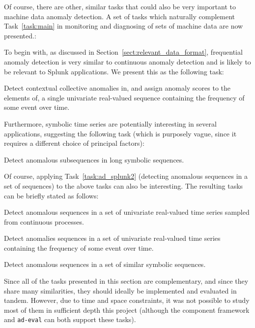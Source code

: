 Of course, there are other, similar tasks that could also be very important to machine data anomaly detection. A set of tasks which naturally complement Task~\ref{task:main} in monitoring and diagnosing of sets of machine data are now presented.:

To begin with, as discussed in Section~\ref{sect:relevant_data_format}, frequential anomaly detection is very similar to continuous anomaly detection and is likely to be relevant to Splunk applications. We present this as the following task:

\begin{task}
  Detect contextual collective anomalies in, and assign anomaly scores to the elements of, a single univariate real-valued sequence containing the frequency of some event over time.
\end{task}

Furthermore, symbolic time series are potentially interesting in several applications, suggesting the following task (which is purposely vague, since it requires a different choice of principal factors):

\begin{task}
  Detect anomalous subsequences in long symbolic sequences.
\end{task}

Of course, applying Task~\ref{task:ad_splunk2} (detecting anomalous sequences in a set of sequences) to the above tasks can also be interesting. The resulting tasks can be briefly stated as follows:

\begin{task}
  Detect anomalous sequences in a set of univariate real-valued time series sampled from continuous processes.
\end{task}

\begin{task}
  Detect anomalies sequences in a set of univariate real-valued time series containing the frequency of some event over time.
\end{task}

\begin{task}
  Detect anomalous sequences in a set of similar symbolic sequences.
\end{task}

Since all of the tasks presented in this section are complementary, and since they share many similarities, they should ideally be implemented and evaluated in tandem. However, due to time and space constraints, it was not possible to study most of them in sufficient depth this project (although the component framework and \texttt{ad-eval} can both support these tasks).

